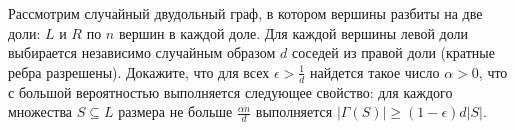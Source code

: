 Рассмотрим случайный двудольный граф, в котором вершины разбиты на две доли: $L$ и $R$ по $n$ вершин в
каждой доле. Для каждой вершины левой доли выбирается независимо случайным образом $d$ соседей из правой
доли (кратные ребра разрешены). Докажите, что для всех $\epsilon > \frac{1}{d}$ найдется такое число
$\alpha > 0$, что с большой вероятностью выполняется следующее свойство: для каждого множества
$S \subseteq L$ размера не больше $\frac{\alpha n}{d}$ выполняется $|\Gamma(S)| \ge (1 - \epsilon)d |S|$.
